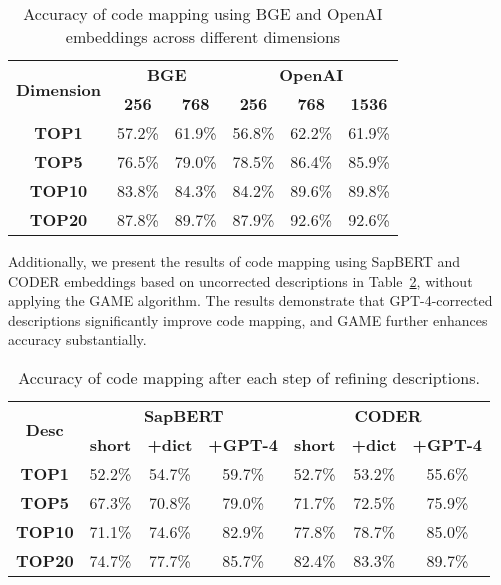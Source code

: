 \documentclass{article}
\begin{document}
\begin{table}[H]
\centering
\begin{tabular}{|c|c|c|c|c|c|}
\hline
\multirow{2}{*}{\textbf{Dimension}} & \multicolumn{2}{c|}{\textbf{BGE}} & \multicolumn{3}{c|}{\textbf{OpenAI}} \\ \cline{2-6}
 & \textbf{256} & \textbf{768} & \textbf{256} & \textbf{768} & \textbf{1536} \\ \hline
\textbf{TOP1}      & 57.2\%       & 61.9\%       & 56.8\%       & 62.2\%       & 61.9\%        \\ \hline
\textbf{TOP5}      & 76.5\%       & 79.0\%       & 78.5\%       & 86.4\%       & 85.9\%        \\ \hline
\textbf{TOP10}     & 83.8\%       & 84.3\%       & 84.2\%       & 89.6\%       & 89.8\%        \\ \hline
\textbf{TOP20}     & 87.8\%       & 89.7\%       & 87.9\%       & 92.6\%       & 92.6\%        \\ \hline
\end{tabular}
\caption{Accuracy of code mapping using BGE and OpenAI embeddings across different dimensions}
\label{R1_GPT}
\end{table}

Additionally, we present the results of code mapping using SapBERT and CODER embeddings based on uncorrected descriptions in Table~\ref{tab:before_GPT}, without applying the GAME algorithm. The results demonstrate that GPT-4-corrected descriptions significantly improve code mapping, and GAME further enhances accuracy substantially.

\begin{table}[H]
\centering
\begin{tabular}{|c|ccc|ccc|}
\hline
\multirow{2}{*}{\textbf{Desc}} & \multicolumn{3}{c|}{\textbf{SapBERT}} & \multicolumn{3}{c|}{\textbf{CODER}} \\ \cline{2-7}
 & \textbf{short} & \textbf{+dict} & \textbf{+GPT-4}& \textbf{short} & \textbf{+dict} & \textbf{+GPT-4} \\ \hline
\textbf{TOP1}   & 52.2\% &  54.7\%    & 59.7\%   & 52.7\% & 53.2\%  & 55.6\%        \\ \hline
\textbf{TOP5}   & 67.3\% &  70.8\%    & 79.0\%   & 71.7\% & 72.5\%  & 75.9\%        \\ \hline
\textbf{TOP10}  & 71.1\% &  74.6\%    & 82.9\%   & 77.8\% & 78.7\%  & 85.0\%         \\ \hline
\textbf{TOP20}  & 74.7\% &  77.7\%    & 85.7\%   & 82.4\% & 83.3\%  & 89.7\%          \\ \hline
\end{tabular}
\caption{Accuracy of code mapping after each step of refining descriptions.}
\label{tab:before_GPT}
\end{table}
\end{document}
